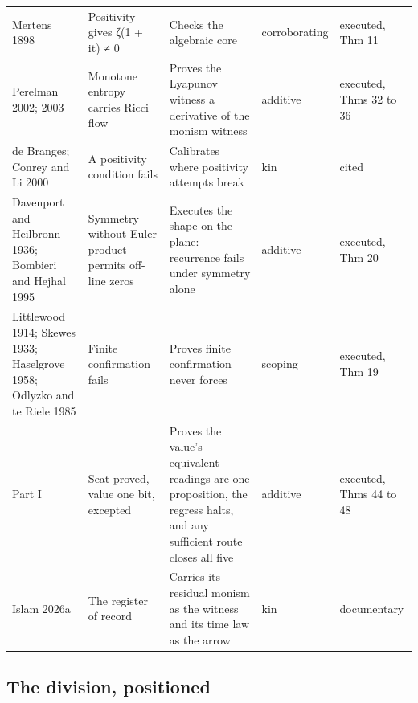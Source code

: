 \documentclass[10pt,twocolumn]{article}
\begin{document}
\begin{table}[!t]
\begin{tabularx}{\textwidth}{@{}P{0.18\textwidth} P{0.19\textwidth} L P{0.115\textwidth} P{0.115\textwidth}@{}}
Mertens 1898 & Positivity gives ζ(1 + it) ≠ 0 & Checks the algebraic core & corroborating & executed, Thm 11 \\
Perelman 2002; 2003 & Monotone entropy carries Ricci flow & Proves the Lyapunov witness a derivative of the monism witness & additive & executed, Thms 32 to 36 \\
de Branges; Conrey and Li 2000 & A positivity condition fails & Calibrates where positivity attempts break & kin & cited \\
Davenport and Heilbronn 1936; Bombieri and Hejhal 1995 & Symmetry without Euler product permits off-line zeros & Executes the shape on the plane: recurrence fails under symmetry alone & additive & executed, Thm 20 \\
Littlewood 1914; Skewes 1933; Haselgrove 1958; Odlyzko and te Riele 1985 & Finite confirmation fails & Proves finite confirmation never forces & scoping & executed, Thm 19 \\
Part I & Seat proved, value one bit, excepted & Proves the value's equivalent readings are one proposition, the regress halts, and any sufficient route closes all five & additive & executed, Thms 44 to 48 \\
Islam 2026a & The register of record & Carries its residual monism as the witness and its time law as the arrow & kin & documentary \\
\bottomrule
\end{tabularx}
\end{table}

\hypertarget{the-division-positioned}{%
\subsection{The division, positioned}\label{the-division-positioned}}
\end{document}

